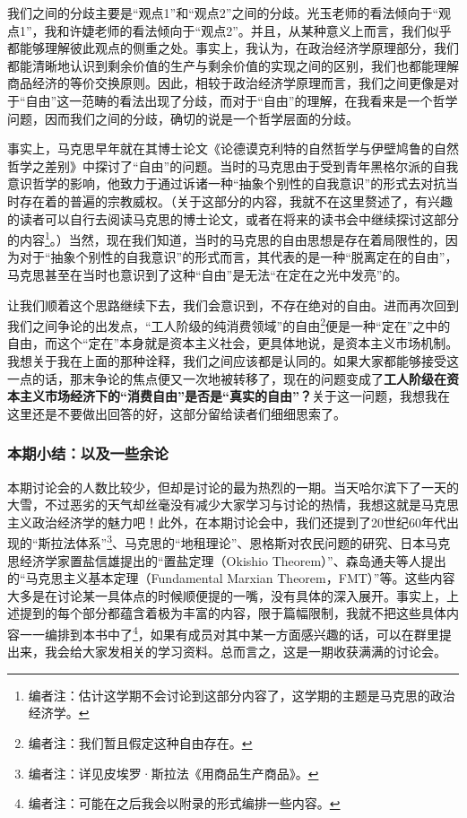 \documentclass[a4paper,twoside,12pt,AutoFakeBold]{ctexart}
\begin{document}
我们之间的分歧主要是“观点1”和“观点2”之间的分歧。光玉老师的看法倾向于“观点1”，我和许婕老师的看法倾向于“观点2”。并且，从某种意义上而言，我们似乎都能够理解彼此观点的侧重之处。事实上，我认为，在政治经济学原理部分，我们都能清晰地认识到剩余价值的生产与剩余价值的实现之间的区别，我们也都能理解商品经济的等价交换原则。因此，相较于政治经济学原理而言，我们之间更像是对于“自由”这一范畴的看法出现了分歧，而对于“自由”的理解，在我看来是一个哲学问题，因而我们之间的分歧，确切的说是一个哲学层面的分歧。

事实上，马克思早年就在其博士论文《论德谟克利特的自然哲学与伊壁鸠鲁的自然哲学之差别》中探讨了“自由”的问题。当时的马克思由于受到青年黑格尔派的自我意识哲学的影响，他致力于通过诉诸一种“抽象个别性的自我意识”的形式去对抗当时存在着的普遍的宗教威权。（关于这部分的内容，我就不在这里赘述了，有兴趣的读者可以自行去阅读马克思的博士论文，或者在将来的读书会中继续探讨这部分的内容\footnote{编者注：估计这学期不会讨论到这部分内容了，这学期的主题是马克思的政治经济学。}。）当然，现在我们知道，当时的马克思的自由思想是存在着局限性的，因为对于“抽象个别性的自我意识”的形式而言，其代表的是一种“脱离定在的自由”，马克思甚至在当时也意识到了这种“自由”是无法“在定在之光中发亮”的。

让我们顺着这个思路继续下去，我们会意识到，不存在绝对的自由。进而再次回到我们之间争论的出发点，“工人阶级的纯消费领域”的自由\footnote{编者注：我们暂且假定这种自由存在。}便是一种“定在”之中的自由，而这个“定在”本身就是资本主义社会，更具体地说，是资本主义市场机制。我想关于我在上面的那种诠释，我们之间应该都是认同的。如果大家都能够接受这一点的话，那末争论的焦点便又一次地被转移了，现在的问题变成了\textbf{工人阶级在资本主义市场经济下的“消费自由”是否是“真实的自由”？}关于这一问题，我想我在这里还是不要做出回答的好，这部分留给读者们细细思索了。

\subsubsection{本期小结：以及一些余论}
本期讨论会的人数比较少，但却是讨论的最为热烈的一期。当天哈尔滨下了一天的大雪，不过恶劣的天气却丝毫没有减少大家学习与讨论的热情，我想这就是马克思主义政治经济学的魅力吧！此外，在本期讨论会中，我们还提到了20世纪60年代出现的“斯拉法体系”\footnote{编者注：详见皮埃罗·斯拉法《用商品生产商品》。}、马克思的“地租理论”、恩格斯对农民问题的研究、日本马克思经济学家置盐信雄提出的“置盐定理（Okishio Theorem）”、森岛通夫等人提出的“马克思主义基本定理（Fundamental Marxian Theorem，FMT）”等。这些内容大多是在讨论某一具体点的时候顺便提的一嘴，没有具体的深入展开。事实上，上述提到的每个部分都蕴含着极为丰富的内容，限于篇幅限制，我就不把这些具体内容一一编排到本书中了\footnote{编者注：可能在之后我会以附录的形式编排一些内容。}，如果有成员对其中某一方面感兴趣的话，可以在群里提出来，我会给大家发相关的学习资料。总而言之，这是一期收获满满的讨论会。
\newpage
\end{document}
